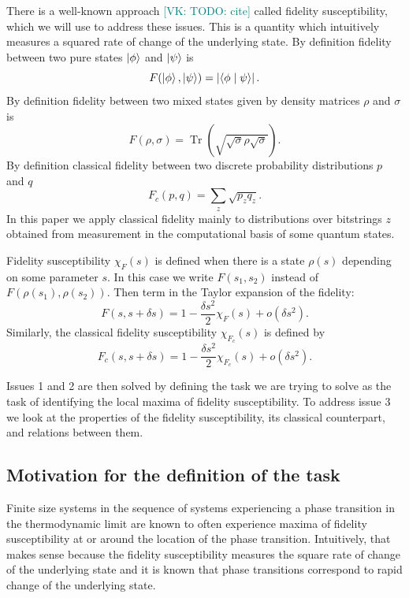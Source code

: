\documentclass[
  american,aps,pra,reprint,floatfix,nofootinbib,superscriptaddress
]{revtex4-2}
\DeclareMathOperator{\Tr}{Tr}
\newcommand{\abs}[1]{\left|#1\right|}
\newcommand{\VK}[1]{\textcolor{teal}{[VK: #1]}}
\begin{document}
There is a well-known approach \VK{TODO: cite} called fidelity susceptibility,
which we will use to address these issues. This is a quantity which
intuitively measures a squared rate of change of the underlying state.
By definition fidelity between two pure states $\ket{\phi}$ and $\ket{\psi}$ is
\begin{equation}
\label{eq:def.F.pure}
  F(\ket{\phi}, \ket{\psi}) = \abs{\braket{\phi\mid \psi}}.
\end{equation}
By definition fidelity between two mixed states
given by density matrices $\rho$ and $\sigma$ is
\begin{equation}
\label{eq:def.F.mixed}
  F(\rho, \sigma) = \Tr\left(\sqrt{\sqrt{\sigma}\rho\sqrt{\sigma}}\right).
\end{equation}
By definition classical fidelity between two discrete probability distributions
$p$ and $q$
\begin{equation}
\label{eq:def.Fc}
  F_c(p, q) = \sum_z \sqrt{p_z q_z}.
\end{equation}
In this paper we apply classical fidelity mainly to distributions over bitstrings
$z$ obtained from measurement in the computational basis of some quantum states.

Fidelity susceptibility $\chi_F(s)$ is defined when there is a state $\rho(s)$
depending on some parameter $s$. In this case we write $F(s_1, s_2)$ instead
of $F(\rho(s_1), \rho(s_2))$. Then
term in the Taylor expansion of the fidelity:
\begin{equation}
\label{eq:def.chiF}
  F(s, s + \delta s) = 1 - \frac{\delta s^2}{2} \chi_F(s) + o(\delta s^2).
\end{equation}
Similarly, the classical fidelity susceptibility $\chi_{F_c}(s)$ is defined by
\begin{equation}
\label{eq:def.chiFc}
  F_c(s, s + \delta s) = 1 - \frac{\delta s^2}{2} \chi_{F_c}(s) + o(\delta s^2).
\end{equation}

Issues 1 and 2 are then solved by defining the task we are trying to solve
as the task of identifying the local maxima of fidelity susceptibility.
To address issue 3 we look at the properties of the fidelity
susceptibility, its classical counterpart, and relations between them.

\subsection{Motivation for the definition of the task}
Finite size systems in the sequence of systems experiencing a phase transition
in the thermodynamic limit are known to often experience maxima of fidelity susceptibility at or around the location of the phase transition. Intuitively, that
makes sense because the fidelity susceptibility measures the square rate of change of the underlying state and it is known that phase transitions correspond to rapid change of the underlying state.
\end{document}
